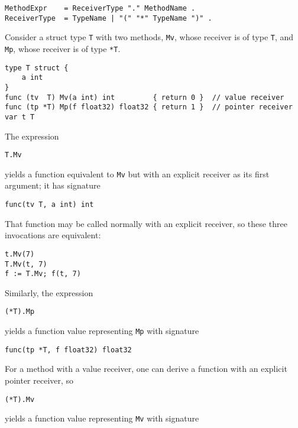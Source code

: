 \begin{Verbatim}[frame=single]
MethodExpr    = ReceiverType "." MethodName .
ReceiverType  = TypeName | "(" "*" TypeName ")" .
\end{Verbatim}

Consider a struct type \texttt{T} with two methods, \texttt{Mv}, whose
receiver is of type \texttt{T}, and \texttt{Mp}, whose receiver is of
type \texttt{*T}.

\begin{Verbatim}[frame=single]
type T struct {
    a int
}
func (tv  T) Mv(a int) int         { return 0 }  // value receiver
func (tp *T) Mp(f float32) float32 { return 1 }  // pointer receiver
var t T
\end{Verbatim}

The expression

\begin{Verbatim}[frame=single]
T.Mv
\end{Verbatim}

yields a function equivalent to \texttt{Mv} but with an explicit
receiver as its first argument; it has signature

\begin{Verbatim}[frame=single]
func(tv T, a int) int
\end{Verbatim}

That function may be called normally with an explicit receiver, so these
three invocations are equivalent:

\begin{Verbatim}[frame=single]
t.Mv(7)
T.Mv(t, 7)
f := T.Mv; f(t, 7)
\end{Verbatim}

Similarly, the expression

\begin{Verbatim}[frame=single]
(*T).Mp
\end{Verbatim}

yields a function value representing \texttt{Mp} with signature

\begin{Verbatim}[frame=single]
func(tp *T, f float32) float32
\end{Verbatim}

For a method with a value receiver, one can derive a function with an
explicit pointer receiver, so

\begin{Verbatim}[frame=single]
(*T).Mv
\end{Verbatim}

yields a function value representing \texttt{Mv} with signature

